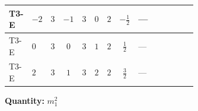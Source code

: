 \documentclass[8pt]{article}
\begin{document}
\begin{landscape}
\begin{longtable}{@{}llcccccc >{\raggedright\arraybackslash}p{0.21\linewidth} >{\raggedright\arraybackslash}p{0.21\linewidth} >{\raggedright\arraybackslash}p{0.21\linewidth}@{}}
\midrule
T3-E & $-2$ & $3$ & $-1$ & $3$ & $0$ & $2$ & $-\frac{1}{2}$ & --- & \scriptsize\adjustbox{max width=\linewidth}{$\begin{gathered} {m_1^2} (2 T_{\nu}^{(1)}+8 {\lambda_{S_1}^{(1)}}+4 {\lambda_{S_1}^{(A)}})\end{gathered}$} & \scriptsize\adjustbox{max width=\linewidth}{$\begin{gathered} -12 {g_2}^2 {m_1^2}\end{gathered}$} \\
\midrule
T3-E & $0$ & $3$ & $0$ & $3$ & $1$ & $2$ & $\frac{1}{2}$ & --- & \scriptsize\adjustbox{max width=\linewidth}{$\begin{gathered} {m_1^2} (2 T_{\nu}^{(1)}+8 {\lambda_{S_1}^{(1)}}+4 {\lambda_{S_1}^{(A)}})\end{gathered}$} & \scriptsize\adjustbox{max width=\linewidth}{$\begin{gathered} -12 {g_2}^2 {m_1^2}\end{gathered}$} \\
\midrule
T3-E & $2$ & $3$ & $1$ & $3$ & $2$ & $2$ & $\frac{3}{2}$ & --- & \scriptsize\adjustbox{max width=\linewidth}{$\begin{gathered} {m_1^2} (2 T_{\nu}^{(1)}+8 {\lambda_{S_1}^{(1)}}+4 {\lambda_{S_1}^{(A)}})\end{gathered}$} & \scriptsize\adjustbox{max width=\linewidth}{$\begin{gathered} -12 {g_2}^2 {m_1^2}\end{gathered}$} \\
\midrule
\bottomrule
\end{longtable}
\clearpage
\noindent\textbf{Quantity: }$m_1^2$\par\smallskip

\end{landscape}
\end{document}
